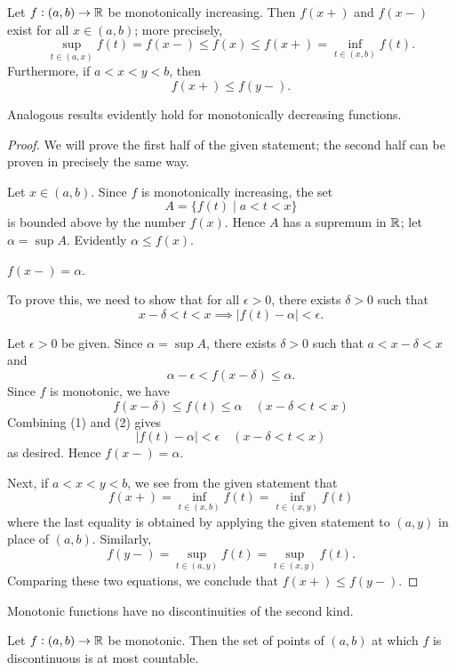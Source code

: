 \begin{proposition}
Let $f:(a,b)\to\mathbb R$ be monotonically increasing. Then $f(x+)$ and $f(x-)$ exist for all $x\in(a,b)$; more precisely,
\[\sup_{t\in(a,x)}f(t)=f(x-)\le f(x)\le f(x+)=\inf_{t\in(x,b)}f(t).\]
Furthermore, if $a<x<y<b$, then
\[f(x+)\le f(y-).\]
\end{proposition}

Analogous results evidently hold for monotonically decreasing functions.

\begin{proof}
We will prove the first half of the given statement; the second half can be proven in precisely the same way.

Let $x\in(a,b)$. Since $f$ is monotonically increasing, the set
\[A=\{f(t)\mid a<t<x\}\]
is bounded above by the number $f(x)$. Hence $A$ has a supremum in $\mathbb R$; let $\alpha=\sup A$. Evidently $\alpha\le f(x)$.
\begin{claim}
$f(x-)=\alpha$.
\end{claim}
To prove this, we need to show that for all $\epsilon>0$, there exists $\delta>0$ such that
\[x-\delta<t<x\implies |f(t)-\alpha|<\epsilon.\]

Let $\epsilon>0$ be given. Since $\alpha=\sup A$, there exists $\delta>0$ such that $a<x-\delta<x$ and
\begin{equation*}\tag{1}
\alpha-\epsilon<f(x-\delta)\le \alpha.
\end{equation*}
Since $f$ is monotonic, we have
\begin{equation*}\tag{2}
f(x-\delta)\le f(t)\le \alpha\quad(x-\delta<t<x)
\end{equation*}
Combining (1) and (2) gives
\[|f(t)-\alpha|<\epsilon\quad(x-\delta<t<x)\]
as desired. Hence $f(x-)=\alpha$.

Next, if $a<x<y<b$, we see from the given statement that
\[f(x+)=\inf_{t\in(x,b)}f(t)=\inf_{t\in(x,y)}f(t)\]
where the last equality is obtained by applying the given statement to $(a,y)$ in place of $(a,b)$. Similarly,
\[f(y-)=\sup_{t\in(a,y)}f(t)=\sup_{t\in(x,y)}f(t).\]
Comparing these two equations, we conclude that $f(x+)\le f(y-)$.
\end{proof}

\begin{corollary}
Monotonic functions have no discontinuities of the second kind.
\end{corollary}

\begin{proposition}
Let $f:(a,b)\to\mathbb R$ be monotonic. Then the set of points of $(a,b)$ at which $f$ is discontinuous is at most countable.
\end{proposition}

